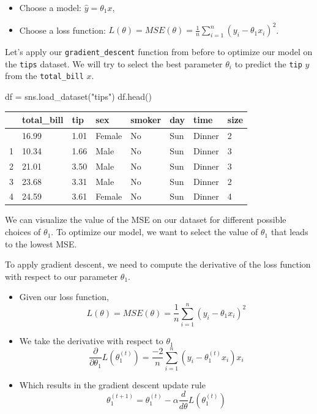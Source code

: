 \documentclass[
  letterpaper,
  DIV=11,
  numbers=noendperiod]{scrreprt}
\newenvironment{Shaded}{\begin{snugshade}}{\end{snugshade}}
\newcommand{\NormalTok}[1]{\textcolor[rgb]{0.00,0.23,0.31}{#1}}
\newcommand{\OperatorTok}[1]{\textcolor[rgb]{0.37,0.37,0.37}{#1}}
\newcommand{\StringTok}[1]{\textcolor[rgb]{0.13,0.47,0.30}{#1}}
\providecommand{\tightlist}{%
  \setlength{\itemsep}{0pt}\setlength{\parskip}{0pt}}\usepackage{longtable,booktabs,array}
\begin{document}
\begin{itemize}
\tightlist
\item
  Choose a model: \(\hat{y} = \theta_1 x\),
\item
  Choose a loss function:
  \(L(\theta) = MSE(\theta) = \frac{1}{n} \sum_{i=1}^n (y_i - \theta_1x_i)^2\).
\end{itemize}

Let's apply our \texttt{gradient\_descent} function from before to
optimize our model on the \texttt{tips} dataset. We will try to select
the best parameter \(\theta_i\) to predict the \texttt{tip} \(y\) from
the \texttt{total\_bill} \(x\).

\begin{Shaded}
\begin{Highlighting}[]
\NormalTok{df }\OperatorTok{=}\NormalTok{ sns.load\_dataset(}\StringTok{"tips"}\NormalTok{)}
\NormalTok{df.head()}
\end{Highlighting}
\end{Shaded}

\begin{longtable}[]{@{}llllllll@{}}
\toprule\noalign{}
& total\_bill & tip & sex & smoker & day & time & size \\
\midrule\noalign{}
\endhead
\bottomrule\noalign{}
\endlastfoot
0 & 16.99 & 1.01 & Female & No & Sun & Dinner & 2 \\
1 & 10.34 & 1.66 & Male & No & Sun & Dinner & 3 \\
2 & 21.01 & 3.50 & Male & No & Sun & Dinner & 3 \\
3 & 23.68 & 3.31 & Male & No & Sun & Dinner & 2 \\
4 & 24.59 & 3.61 & Female & No & Sun & Dinner & 4 \\
\end{longtable}

We can visualize the value of the MSE on our dataset for different
possible choices of \(\theta_1\). To optimize our model, we want to
select the value of \(\theta_1\) that leads to the lowest MSE.

To apply gradient descent, we need to compute the derivative of the loss
function with respect to our parameter \(\theta_1\).

\begin{itemize}
\tightlist
\item
  Given our loss function,
  \[L(\theta) = MSE(\theta) = \frac{1}{n} \sum_{i=1}^n (y_i - \theta_1x_i)^2\]
\item
  We take the derivative with respect to \(\theta_1\)
  \[\frac{\partial}{\partial \theta_{1}} L(\theta_1^{(t)}) = \frac{-2}{n} \sum_{i=1}^n (y_i - \theta_1^{(t)} x_i) x_i\]
\item
  Which results in the gradient descent update rule
  \[\theta_1^{(t+1)} = \theta_1^{(t)} - \alpha \frac{d}{d\theta}L(\theta_1^{(t)})\]
\end{itemize}
\end{document}
